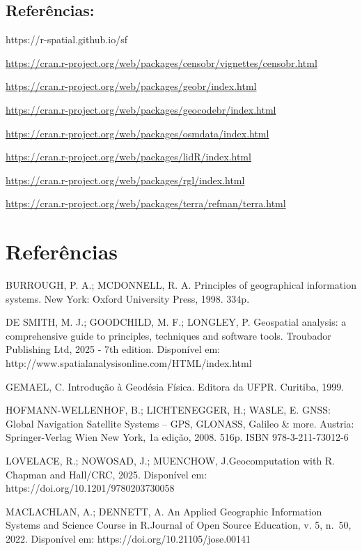 \documentclass[
  letterpaper,
  DIV=11,
  numbers=noendperiod]{scrreprt}
\begin{document}
\section{Referências:}\label{referuxeancias-3}

https://r-spatial.github.io/sf

\url{https://cran.r-project.org/web/packages/censobr/vignettes/censobr.html}

\url{https://cran.r-project.org/web/packages/geobr/index.html}

\url{https://cran.r-project.org/web/packages/geocodebr/index.html}

\url{https://cran.r-project.org/web/packages/osmdata/index.html}

\url{https://cran.r-project.org/web/packages/lidR/index.html}

\url{https://cran.r-project.org/web/packages/rgl/index.html}

\url{https://cran.r-project.org/web/packages/terra/refman/terra.html}


\chapter*{Referências}\label{referuxeancias-4}


BURROUGH, P. A.; MCDONNELL, R. A. Principles of geographical information
systems. New York: Oxford University Press, 1998. 334p.

DE SMITH, M. J.; GOODCHILD, M. F.; LONGLEY, P. Geospatial analysis: a
comprehensive guide to principles, techniques and software tools.
Troubador Publishing Ltd, 2025 - 7th edition. Disponível em:
http://www.spatialanalysisonline.com/HTML/index.html

GEMAEL, C. Introdução à Geodésia Física. Editora da UFPR. Curitiba,
1999.

HOFMANN-WELLENHOF, B.; LICHTENEGGER, H.; WASLE, E. GNSS: Global
Navigation Satellite Systems -- GPS, GLONASS, Galileo \& more. Austria:
Springer-Verlag Wien New York, 1a edição, 2008. 516p. ISBN
978-3-211-73012-6

LOVELACE, R.; NOWOSAD, J.; MUENCHOW, J.Geocomputation with R. Chapman
and Hall/CRC, 2025. Disponível em: https://doi.org/10.1201/9780203730058

MACLACHLAN, A.; DENNETT, A. An Applied Geographic Information Systems
and Science Course in R.Journal of Open Source Education, v. 5, n.~50,
2022. Disponível em: https://doi.org/10.21105/jose.00141
\end{document}
